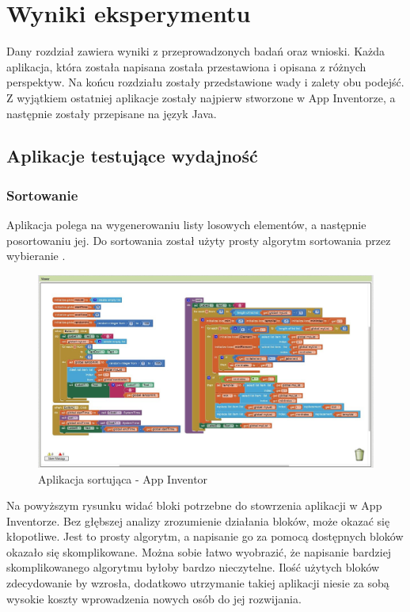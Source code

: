 \chapter{Wyniki eksperymentu}
\label{c5}

Dany rozdział zawiera wyniki z przeprowadzonych badań oraz wnioski. Każda aplikacja, która została napisana została przestawiona i opisana z różnych perspektyw. Na końcu rozdziału zostały przedstawione wady i zalety obu podejść. Z wyjątkiem ostatniej aplikacje zostały najpierw stworzone w App Inventorze, a następnie zostały przepisane na język Java.

\section{Aplikacje testujące wydajność}

\subsection{Sortowanie}

Aplikacja polega na wygenerowaniu listy losowych elementów, a następnie posortowaniu jej. Do sortowania został użyty prosty algorytm sortowania przez wybieranie .

\begin{figure}[th] 
\centering\includegraphics[width=15cm]{figures/apps/sort}
\caption{Aplikacja sortująca - App Inventor}
\end{figure}

Na powyższym rysunku widać bloki potrzebne do stowrzenia aplikacji w App Inventorze. Bez głębszej analizy zrozumienie działania bloków, może okazać się kłopotliwe. Jest to prosty algorytm, a napisanie go za pomocą dostępnych bloków okazało się skomplikowane. Można sobie łatwo wyobrazić, że napisanie bardziej skomplikowanego algorytmu byłoby bardzo nieczytelne. Ilość użytych bloków zdecydowanie by wzrosła, dodatkowo utrzymanie takiej aplikacji niesie za sobą wysokie koszty wprowadzenia nowych osób do jej rozwijania.

